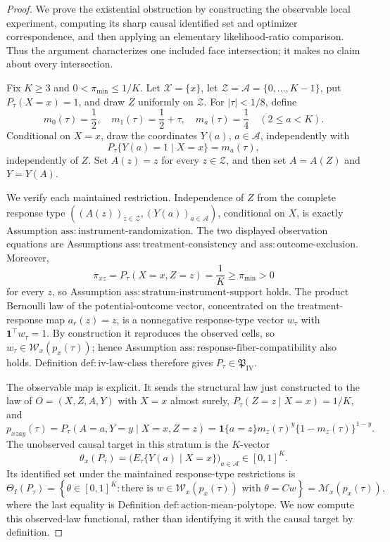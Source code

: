 \documentclass{article}
\begin{document}
\begin{proof}
We prove the existential obstruction by constructing the observable local experiment, computing its sharp causal identified set and optimizer correspondence, and then applying an elementary likelihood-ratio comparison.  Thus the argument characterizes one included face intersection; it makes no claim about every intersection.

Fix \(K\geq3\) and \(0<\pi_{\min}\leq1/K\).  Let \(\mathcal X=\{x\}\), let \(\mathcal Z=\mathcal A=\{0,\ldots,K-1\}\), put \(P_\tau(X=x)=1\), and draw \(Z\) uniformly on \(\mathcal Z\).  For \(|\tau|<1/8\), define
\[
 m_0(\tau)=\frac12,\quad
 m_1(\tau)=\frac12+\tau,\quad
 m_a(\tau)=\frac14\quad(2\leq a<K).
\]
Conditional on \(X=x\), draw the coordinates \(Y(a)\), \(a\in\mathcal A\), independently with
\[
 P_\tau\{Y(a)=1\mid X=x\}=m_a(\tau),
\]
independently of \(Z\).  Set \(A(z)=z\) for every \(z\in\mathcal Z\), and then set \(A=A(Z)\) and \(Y=Y(A)\).

We verify each maintained restriction.  Independence of \(Z\) from the complete response type \(((A(z))_{z\in\mathcal Z},(Y(a))_{a\in\mathcal A})\), conditional on \(X\), is exactly Assumption \(\mathrm{ass{:}instrument\text{-}randomization}\).  The two displayed observation equations are Assumptions \(\mathrm{ass{:}treatment\text{-}consistency}\) and \(\mathrm{ass{:}outcome\text{-}exclusion}\).  Moreover,
\[
 \pi_{xz}=P_\tau(X=x,Z=z)=\frac1K\geq\pi_{\min}>0
\]
for every \(z\), so Assumption \(\mathrm{ass{:}stratum\text{-}instrument\text{-}support}\) holds.  The product Bernoulli law of the potential-outcome vector, concentrated on the treatment-response map \(a_r(z)=z\), is a nonnegative response-type vector \(w_\tau\) with \(\mathbf1^\top w_\tau=1\).  By construction it reproduces the observed cells, so \(w_\tau\in\mathcal W_x(p_x(\tau))\); hence Assumption \(\mathrm{ass{:}response\text{-}fiber\text{-}compatibility}\) also holds.  Definition \(\mathrm{def{:}iv\text{-}law\text{-}class}\) therefore gives \(P_\tau\in\mathfrak P_{\mathrm{IV}}\).

The observable map is explicit.  It sends the structural law just constructed to the law of \(O=(X,Z,A,Y)\) with \(X=x\) almost surely, \(P_\tau(Z=z\mid X=x)=1/K\), and
\[
 p_{xzay}(\tau)
 =P_\tau(A=a,Y=y\mid X=x,Z=z)
 =\mathbf1\{a=z\}m_z(\tau)^y\{1-m_z(\tau)\}^{1-y}.
\]
The unobserved causal target in this stratum is the \(K\)-vector
\[
 \theta_x(P_\tau)
 =\bigl(E_\tau\{Y(a)\mid X=x\}\bigr)_{a\in\mathcal A}
 \in[0,1]^K.
\]
Its identified set under the maintained response-type restrictions is
\[
 \Theta_I(P_\tau)
 =\left\{\theta\in[0,1]^K:
       \text{there is }w\in\mathcal W_x(p_x(\tau))\text{ with }\theta=Cw\right\}
 =\mathcal M_x(p_x(\tau)),
\]
where the last equality is Definition \(\mathrm{def{:}action\text{-}mean\text{-}polytope}\).  We now compute this observed-law functional, rather than identifying it with the causal target by definition.


\end{proof}
\end{document}
